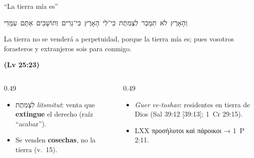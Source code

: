 \documentclass[hyperref={bookmarks=false},aspectratio=169]{beamer}
\newcommand{\heb}[1]{\mbox{\foreignlanguage{hebrew}{#1}}}
\newcommand{\grc}[1]{\foreignlanguage{ancientgreek}{#1}}
\newcommand{\fuente}[1]{\par\hfill{\upshape\bfseries\footnotesize\textcolor{tierraroja}{#1}}}
\newcommand{\destacar}[1]{\textbf{\textcolor{tierraroja}{#1}}}
\begin{document}
\begin{frame}{``La tierra mía es''}
\begin{center}\heb{וְהָאָרֶץ לֹא תִמָּכֵר לִצְמִתֻת כִּי־לִי הָאָרֶץ כִּי־גֵרִים וְתוֹשָׁבִים אַתֶּם עִמָּדִי}\end{center}
\begin{cita}La tierra no se venderá a perpetuidad, porque la tierra mía es; pues vosotros forasteros y extranjeros sois para conmigo.\fuente{(Lv 25:23)}\end{cita}
\begin{columns}[t,onlytextwidth]
\begin{column}{0.49\textwidth}\small
\begin{itemize}
\item \heb{לִצְמִתֻת} \emph{litsmitut}: venta que \destacar{extingue} el derecho (raíz ``acabar'').
\item Se venden \destacar{cosechas}, no la tierra (v.~15).
\end{itemize}
\end{column}
\begin{column}{0.49\textwidth}\small
\begin{itemize}
\item \emph{Guer ve-toshav}: residentes en tierra de Dios (Sal 39:12 [39:13]; 1~Cr 29:15).
\item LXX \grc{προσήλυτοι καὶ πάροικοι} → 1~P 2:11.
\end{itemize}
\end{column}
\end{columns}
\end{frame}
\end{document}
